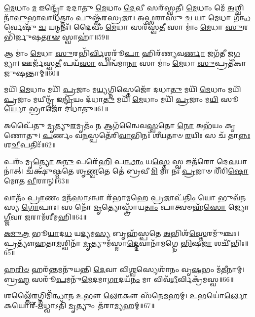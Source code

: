 \-\ul{𑌮𑍇}\-𑌧𑌾𑌂 \ul{𑌮} 𑌇𑌨𑍍𑌦𑍍𑌰𑍋᳴ 𑌦𑌦𑌾𑌤𑍁 \ul{𑌮𑍇}\-𑌧𑌾𑌂 \ul{𑌦𑍇}\-𑌵𑍀 𑌸𑌰᳴𑌸𑍍𑌵𑌤𑍀। 
\-\ul{𑌮𑍇}\-𑌧𑌾𑌂 𑌮𑍇᳴ \ul{𑌅}\-𑌶𑍍𑌵𑌿𑌨𑌾᳴\-\ul{𑌵𑍁}\-𑌭𑌾𑌵𑌾𑌧᳴\-\ul{𑌤𑍍𑌤𑌾𑌂} 𑌪𑍁𑌷𑍍𑌕᳴𑌰𑌸𑍍𑌰𑌜𑌾। 
\-\ul{𑌅}\-\-\ul{𑌫𑍍𑌸}\-𑌰𑌾𑌸𑍁᳴ \ul{𑌚} 𑌯𑌾 \ul{𑌮𑍇}\-𑌧𑌾 𑌗᳴\-\ul{𑌨𑍍𑌧}\-𑌰𑍍𑌵𑍇𑌷𑍁᳴ \ul{𑌚} 𑌯𑌨𑍍𑌮𑌨𑌃᳴। 
𑌦𑍈𑌵𑍀𑌂॑ \ul{𑌮𑍇}\-𑌧𑌾 𑌸𑌰᳴𑌸𑍍𑌵\-\ul{𑌤𑍀} 𑌸𑌾 𑌮𑌾𑌂॑ \ul{𑌮𑍇}\-𑌧𑌾 \ul{𑌸𑍁}\-𑌰𑌭𑌿᳴𑌰𑍍𑌜𑍁𑌷\-\ul{𑌤𑌾}\-\-\ul{𑍟} 𑌸𑍍𑌵𑌾𑌹𑌾॑॥59॥
\anuvakamend


𑌆 𑌮𑌾𑌂॑ \ul{𑌮𑍇}\-𑌧𑌾 \ul{𑌸𑍁}\-𑌰𑌭𑌿᳴\-\ul{𑌰𑍍𑌵𑌿}\-𑌶𑍍𑌵𑌰𑍂᳴\-\ul{𑌪𑌾} 𑌹𑌿𑌰᳴𑌣𑍍𑌯𑌵\-\ul{𑌰𑍍𑌣𑌾} 𑌜𑌗᳴𑌤𑍀 𑌜\-\ul{𑌗}\-𑌮𑍍𑌯𑌾। 
𑌊𑌰𑍍𑌜᳴𑌸𑍍𑌵\-\ul{𑌤𑍀} 𑌪𑌯᳴\-\ul{𑌸𑌾} 𑌪𑌿𑌨𑍍𑌵᳴𑌮𑌾\-\ul{𑌨𑌾} 𑌸𑌾 𑌮𑌾𑌂॑ \ul{𑌮𑍇}\-𑌧𑌾 \ul{𑌸𑍁}\-𑌪𑍍𑌰𑌤𑍀᳴𑌕𑌾 𑌜𑍁𑌷𑌨𑍍𑌤𑌾𑌮𑍍॥60॥ 
\anuvakamend

𑌮𑌯𑌿᳴ \ul{𑌮𑍇}\-𑌧𑌾𑌂 𑌮𑌯𑌿᳴ \ul{𑌪𑍍𑌰}\-𑌜𑌾𑌂 𑌮\-\ul{𑌯𑍍𑌯}\-𑌗𑍍𑌨𑌿𑌸𑍍𑌤𑍇𑌜𑍋᳴ 𑌦𑌧𑌾\-\ul{𑌤𑍁} 𑌮𑌯𑌿᳴ \ul{𑌮𑍇}\-𑌧𑌾𑌂 𑌮𑌯𑌿᳴ \ul{𑌪𑍍𑌰}\-𑌜𑌾𑌂 𑌮𑌯𑍀𑌨𑍍𑌦𑍍𑌰᳴ 𑌇\-\ul{𑌨𑍍𑌦𑍍𑌰𑌿}\-𑌯𑌂 𑌦᳴𑌧𑌾\-\ul{𑌤𑍁} 𑌮𑌯𑌿᳴ \ul{𑌮𑍇}\-𑌧𑌾𑌂 𑌮𑌯𑌿᳴ \ul{𑌪𑍍𑌰}\-𑌜𑌾𑌂 𑌮\-\ul{𑌯𑌿} 𑌸𑍂\-\ul{𑌰𑍍𑌯𑍋} 𑌭𑍍𑌰𑌾𑌜𑍋᳴ 𑌦𑌧𑌾𑌤𑍁॥61॥ 
\anuvakamend


𑌅𑌪𑍈᳴𑌤𑍁 \ul{𑌮𑍃}\-𑌤𑍍𑌯𑍁\-\ul{𑌰}\-𑌮𑍃𑌤𑌂᳴ \ul{𑌨} 𑌆𑌗᳴𑌨𑍍𑌵𑍈𑌵\-\ul{𑌸𑍍𑌵}\-𑌤𑍋 \ul{𑌨𑍋} 𑌅𑌭᳴𑌯𑌂 𑌕𑍃𑌣𑍋𑌤𑍁। 
\-\ul{𑌪}\-𑌰𑍍𑌣𑌂 𑌵\-\ul{𑌨}\-𑌸𑍍𑌪𑌤𑍇᳴𑌰𑌿\-\ul{𑌵𑌾}\-𑌭𑌿𑌨𑌃᳴ 𑌶𑍀𑌯𑌤𑌾𑍞 \ul{𑌰}\-𑌯𑌿𑌃 𑌸 𑌚᳴ 𑌤𑌾\-\ul{𑌨𑍍𑌨𑌃} 𑌶\-\ul{𑌚𑍀}\-𑌪𑌤𑌿𑌃᳴॥62॥%
\anuvakamend

 𑌪𑌰𑌂᳴ 𑌮𑍃\-\ul{𑌤𑍍𑌯𑍋} 𑌅\-\ul{𑌨𑍁} 𑌪𑌰𑍇᳴\-\ul{𑌹𑌿} 𑌪\-\ul{𑌨𑍍𑌥𑌾𑌂} 𑌯\-\ul{𑌸𑍍𑌤𑍇} 𑌸𑍍𑌵 𑌇𑌤᳴𑌰𑍋 𑌦𑍇\-\ul{𑌵}\-𑌯𑌾𑌨𑌾॑𑌤𑍍। 
 𑌚𑌕𑍍𑌷𑍁᳴𑌷𑍍𑌮𑌤𑍇 𑌶𑍃\-\ul{𑌣𑍍𑌵}\-𑌤𑍇 𑌤𑍇॑ 𑌬𑍍𑌰𑌵𑍀\-\ul{𑌮𑌿} 𑌮𑌾 𑌨𑌃᳴ \ul{𑌪𑍍𑌰}\-𑌜𑌾𑍞 𑌰𑍀᳴𑌰𑌿\-\ul{𑌷𑍋} 𑌮𑍋𑌤 \ul{𑌵𑍀}\-𑌰𑌾𑌨𑍍॥63॥%
 \anuvakamend
 
 𑌵𑌾𑌤𑌂᳴ \ul{𑌪𑍍𑌰𑌾}\-𑌣𑌂 𑌮𑌨᳴\-\ul{𑌸𑌾}\-𑌽𑌨𑍍𑌵𑌾 𑌰᳴𑌭𑌾𑌮𑌹𑍇 \ul{𑌪𑍍𑌰}\-𑌜𑌾𑌪᳴\-\ul{𑌤𑌿𑌂} 𑌯𑍋 𑌭𑍁𑌵᳴𑌨𑌸𑍍𑌯 \ul{𑌗𑍋}\-𑌪𑌾𑌃। 
 𑌸 𑌨𑍋᳴ \ul{𑌮𑍃}\-𑌤𑍍𑌯𑍋𑌸𑍍𑌤𑍍𑌰𑌾᳴𑌯\-\ul{𑌤𑌾𑌂} 𑌪𑌾𑌤𑍍𑌵𑍞𑌹᳴\-\ul{𑌸𑍋} 𑌜𑍍𑌯𑍋\-\ul{𑌗𑍍𑌜𑍀}\-𑌵𑌾 \ul{𑌜}\-𑌰𑌾𑌮᳴𑌶𑍀𑌮𑌹𑌿॥64॥
 \anuvakamend
 
 \ul{𑌅}\-\-\ul{𑌮𑍁}\-\-\ul{𑌤𑍍𑌰} 𑌭𑍂\-\ul{𑌯𑌾}\-𑌦\-\ul{𑌧} 𑌯\-\ul{𑌦𑍍𑌯}\-𑌮\-\ul{𑌸𑍍𑌯} 𑌬𑍃𑌹᳴𑌸𑍍𑌪𑌤𑍇 \ul{𑌅}\-𑌭𑌿𑌶᳴\-\ul{𑌸𑍍𑌤𑍇}\-𑌰𑌮𑍁᳴𑌞𑍍𑌚𑌃। 
 𑌪𑍍𑌰𑌤𑍍𑌯𑍗᳴𑌹𑌤𑌾\-\ul{𑌮}\-𑌶𑍍𑌵𑌿𑌨𑌾᳴ \ul{𑌮𑍃}\-𑌤𑍍𑌯𑍁𑌮᳴𑌸𑍍𑌮𑌾\-\ul{𑌦𑍍𑌦𑍇}\-𑌵𑌾𑌨𑌾᳴𑌮𑌗𑍍𑌨𑍇 \ul{𑌭𑌿}\-𑌷\-\ul{𑌜𑌾} 𑌶𑌚𑍀᳴𑌭𑌿𑌃॥65॥
 \anuvakamend
 
 𑌹\-\ul{𑌰𑌿}\-\-\ul{𑍞} 𑌹𑌰᳴\-\ul{𑌨𑍍𑌤}\-𑌮𑌨𑍁᳴𑌯𑌨𑍍𑌤𑌿 \ul{𑌦𑍇}\-𑌵𑌾 𑌵𑌿\-\ul{𑌶𑍍𑌵}\-𑌸𑍍𑌯𑍇𑌶𑌾᳴𑌨𑌂 𑌵𑍃\-\ul{𑌷}\-𑌭𑌂 𑌮᳴\-\ul{𑌤𑍀}\-𑌨𑌾𑌮𑍍। 
 𑌬𑍍𑌰\-\ul{𑌹𑍍𑌮} 𑌸𑌰𑍂᳴\-\ul{𑌪}\-𑌮𑌨𑍁᳴\-\ul{𑌮𑍇}\-𑌦𑌮𑌾\-\ul{𑌗𑌾}\-𑌦𑌯᳴\-\ul{𑌨𑌂} 𑌮𑌾 𑌵𑌿𑌵᳴\-\ul{𑌧𑍀}\-𑌰𑍍𑌵𑌿𑌕𑍍𑌰᳴𑌮𑌸𑍍𑌵॥66॥
 \anuvakamend
 
 𑌶𑌲𑍍𑌕𑍈᳴\-\ul{𑌰}\-𑌗𑍍𑌨𑌿𑌮𑌿᳴\-\ul{𑌨𑍍𑌧𑌾}\-𑌨 \ul{𑌉}\-𑌭𑍗 \ul{𑌲𑍋}\-𑌕𑍗 𑌸᳴𑌨𑍇\-\ul{𑌮}\-𑌹𑌮𑍍। 
 \ul{𑌉}\-𑌭𑌯𑍋॑\-\ul{𑌰𑍍𑌲𑍋}\-𑌕𑌯𑍋𑌰𑍍᳴-\-\ul{𑌋}\-𑌧𑍍𑌵𑌾𑌽𑌤𑌿᳴ \ul{𑌮𑍃}\-𑌤𑍍𑌯𑍁𑌂 𑌤᳴𑌰𑌾\-\ul{𑌮𑍍𑌯}\-𑌹𑌮𑍍॥67॥
\anuvakamend
 
